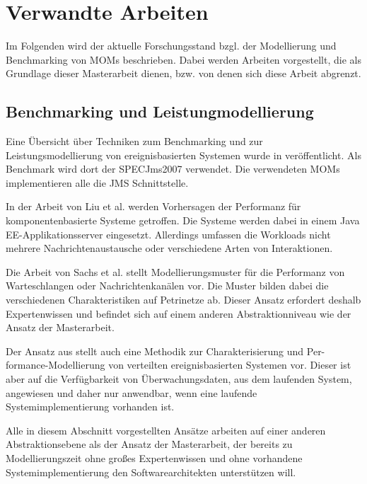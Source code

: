 
\chapter{Verwandte Arbeiten}
\label{ch:Verwandte}
Im Folgenden wird der aktuelle Forschungsstand bzgl. der Modellierung und Benchmarking von MOMs beschrieben. Dabei werden Arbeiten vorgestellt, die als Grundlage dieser Masterarbeit dienen, bzw. von denen sich diese Arbeit abgrenzt.

\section{Benchmarking und Leistungmodellierung}
Eine Übersicht über Techniken zum Benchmarking und zur Leistungsmodellierung von ereignisbasierten Systemen wurde in \cite{Kounev2009} veröffentlicht. Als Benchmark wird dort der SPECJms2007 verwendet. Die verwendeten MOMs implementieren alle die JMS Schnittstelle. \par
In der Arbeit von Liu et al. \cite{Liu2005} werden Vorhersagen der Performanz für komponentenbasierte Systeme getroffen. Die Systeme werden dabei in einem Java EE-Applikationsserver eingesetzt. Allerdings umfassen die Workloads nicht mehrere Nachrichtenaustausche oder verschiedene Arten von Interaktionen. \par
Die Arbeit von Sachs et al. \cite{Sachs2013} stellt Modellierungsmuster für die Performanz von Warteschlangen oder Nachrichtenkanälen vor. Die Muster bilden dabei die verschiedenen Charakteristiken auf Petrinetze ab. Dieser Ansatz erfordert deshalb Expertenwissen und befindet sich auf einem anderen Abstraktionniveau wie der Ansatz der Masterarbeit. \par
Der Ansatz aus \cite{Kounev2008} stellt auch eine Methodik zur Charakterisierung und Per-formance-Modellierung von verteilten ereignisbasierten Systemen vor. Dieser ist aber auf die Verfügbarkeit von Überwachungsdaten, aus dem laufenden System, angewiesen und daher nur anwendbar, wenn eine laufende Systemimplementierung vorhanden ist. \par
Alle in diesem Abschnitt vorgestellten Ansätze arbeiten auf einer anderen Abstraktionsebene als der Ansatz der Masterarbeit, der bereits zu Modellierungszeit ohne großes Expertenwissen und ohne vorhandene Systemimplementierung den Softwarearchitekten unterstützen will.

